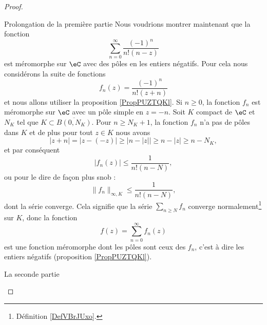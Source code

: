 \begin{proof}
\begin{subproof}
        \item[Prolongation de la première partie] Nous voudrions montrer maintenant que la fonction
            \begin{equation}
                \sum_{n=0}^{\infty}\frac{ (-1)^n }{ n!(n-z) }
            \end{equation}
            est méromorphe sur \( \eC\) avec des pôles en les entiers négatifs. Pour cela nous considérons la suite de fonctions
            \begin{equation}
                f_n(z)=\frac{ (-1)^n }{ n!(z+n) }
            \end{equation}
            et nous allons utiliser la proposition \ref{PropPUZTQKl}. Si \( n\geq 0\), la fonction \( f_n\) est méromorphe sur \( \eC\) avec un pôle simple en \( z=-n\). Soit \( K\) compact de \( \eC\) et \( N_K\) tel que \( K\subset\overline{ B(0,N_K) }\). Pour \( n\geq N_K+1\), la fonction \( f_n\) n'a pas de pôles dans \( K\) et de plus pour tout \( z\in K\) nous avons
            \begin{equation}
                | z+n |=| z-(-z) |\geq\big| n-| z | \big|\geq n-| z |\geq n-N_K,
            \end{equation}
            et par conséquent
            \begin{equation}
                | f_n(z) |\leq \frac{1}{ n!(n-N) },
            \end{equation}
            ou pour le dire de façon plus snob :
            \begin{equation}
                \| f_n \|_{\infty,K}\leq \frac{1}{ n!(n-N) },
            \end{equation}
            dont la série converge. Cela signifie que la série \( \sum_{n\geq N}f_n\) converge normalement\footnote{Définition \ref{DefVBrJUxo}.} sur \( K\), donc la fonction
            \begin{equation}
                f(z)=\sum_{n=0}^{\infty}f_n(z)
            \end{equation}
            est une fonction méromorphe dont les pôles sont ceux des \( f_n\), c'est à dire les entiers négatifs (proposition \ref{PropPUZTQKl}).

        \item[La seconde partie] 
            

\end{subproof}
\end{proof}
